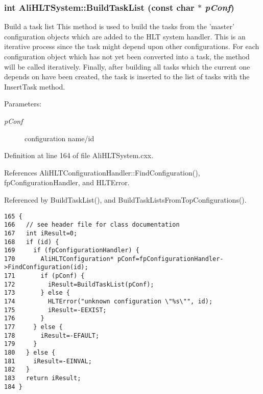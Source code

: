 \subsubsection{\setlength{\rightskip}{0pt plus 5cm}int Ali\-HLTSystem::Build\-Task\-List (const char $\ast$ {\em p\-Conf})}\label{classAliHLTSystem_a7}


Build a task list This method is used to build the tasks from the 'master' configuration objects which are added to the HLT system handler. This is an iterative process since the task might depend upon other configurations. For each configuration object which has not yet been converted into a task, the method will be called iteratively. Finally, after building all tasks which the current one depends on have been created, the task is inserted to the list of tasks with the Insert\-Task method. \begin{Desc}
\item[Parameters:]
\begin{description}
\item[{\em p\-Conf}]configuration name/id \end{description}
\end{Desc}


Definition at line 164 of file Ali\-HLTSystem.cxx.

References Ali\-HLTConfiguration\-Handler::Find\-Configuration(), fp\-Configuration\-Handler, and HLTError.

Referenced by Build\-Task\-List(), and Build\-Task\-Lists\-From\-Top\-Configurations().

\footnotesize\begin{verbatim}165 {
166   // see header file for class documentation
167   int iResult=0;
168   if (id) {
169     if (fpConfigurationHandler) {
170       AliHLTConfiguration* pConf=fpConfigurationHandler->FindConfiguration(id);
171       if (pConf) {
172         iResult=BuildTaskList(pConf);
173       } else {
174         HLTError("unknown configuration \"%s\"", id);
175         iResult=-EEXIST;
176       }
177     } else {
178       iResult=-EFAULT;
179     }
180   } else {
181     iResult=-EINVAL;
182   }
183   return iResult;
184 }
\end{verbatim}\normalsize 


